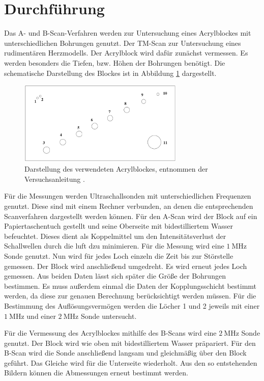 \section{Durchführung}
\label{sec:Durchführung}

Das A- und B-Scan-Verfahren werden zur Untersuchung eines Acrylblockes mit unterschiedlichen Bohrungen genutzt.
Der TM-Scan zur Untersuchung eines rudimentären Herzmodells.
Der Acrylblock wird dafür zunächst vermessen.
Es werden besonders die Tiefen, bzw. Höhen der Bohrungen benötigt.
Die schematische Darstellung des Blockes ist in Abbildung \ref{fig:kenblock} dargestellt.

\begin{figure}
  \centering
  \includegraphics[width=0.7\textwidth]{images/kenblock.png}
  \caption{Darstellung des verwendeten Acrylblockes, entnommen der Versuchsanleitung \cite[5]{sample}.}
  \label{fig:kenblock}
\end{figure}

Für die Messungen werden Ultraschallsonden mit unterschiedlichen Frequenzen genutzt.
Diese sind mit einem Rechner verbunden, an denen die entsprechenden Scanverfahren dargestellt werden können.
Für den A-Scan wird der Block auf ein Papiertaschentuch gestellt und seine Oberseite mit bidestilliertem Wasser befeuchtet.
Dieses dient als Koppelmittel um den Intensitätsverlust der Schallwellen durch die luft dzu minimieren.
Für die Messung wird eine $\SI{1}{\mega\hertz}$ Sonde genutzt.
Nun wird für jedes Loch einzeln die Zeit bis zur Störstelle gemessen.
Der Block wird anschließend umgedreht.
Es wird erneut jedes Loch gemessen.
Aus beiden Daten lässt sich später die Größe der Bohrungen bestimmen.
Es muss außerdem einmal die Daten der Kopplungsschicht bestimmt werden, da diese zur genauen Berechnung berücksichtigt werden müssen.
Für die Bestimmung des Auflösungsvermögen werden die Löcher 1 und 2 jeweils mit einer $\SI{1}{\mega\hertz}$ und einer $\SI{2}{\mega\hertz}$ Sonde untersucht.

Für die Vermessung des Acrylblockes mithilfe des B-Scans wird eine $\SI{2}{\mega\hertz}$ Sonde genutzt.
Der Block wird wie oben mit bidestilliertem Wasser präpariert.
Für den B-Scan wird die Sonde anschließend langsam und gleichmäßig über den Block geführt.
Das Gleiche wird für die Unterseite wiederholt.
Aus den so entstehenden Bildern können die Abmessungen erneut bestimmt werden.

